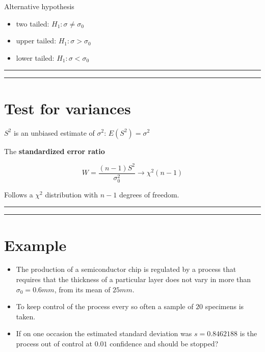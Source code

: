 \documentclass[
]{book}
\begin{document}
Alternative hypothesis

\begin{itemize}
\item
  two tailed: \(H_1:\sigma \neq \sigma_0\)
\item
  upper tailed: \(H_1:\sigma > \sigma_0\)
\item
  lower tailed: \(H_1:\sigma < \sigma_0\)
\end{itemize}

\begin{center}\rule{0.5\linewidth}{0.5pt}\end{center}

\begin{center}\rule{0.5\linewidth}{0.5pt}\end{center}

\hypertarget{test-for-variances-3}{%
\section{Test for variances}\label{test-for-variances-3}}

\(S^2\) is an unbiased estimate of \(\sigma^2\): \(E(S^2)=\sigma^2\)

The \textbf{standardized error ratio}

\[W=\frac{(n-1)S^2}{\sigma_0^2} \rightarrow \chi^2(n-1)\]

Follows a \(\chi^2\) distribution with \(n-1\) degrees of freedom.

\begin{center}\rule{0.5\linewidth}{0.5pt}\end{center}

\begin{center}\rule{0.5\linewidth}{0.5pt}\end{center}

\hypertarget{example-21}{%
\section{Example}\label{example-21}}

\begin{itemize}
\item
  The production of a semiconductor chip is regulated by a process that requires that the thickness of a particular layer does not vary in more than \(\sigma_0=0.6mm\), from its mean of \(25mm\).
\item
  To keep control of the process every so often a sample of \(20\) specimens is taken.
\item
  If on one occasion the estimated standard deviation was \(s=0.8462188\) is the process out of control at \(0.01\) confidence and should be stopped?
\end{itemize}
\end{document}
